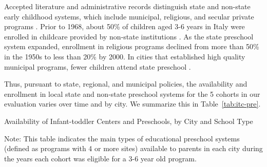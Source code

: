 Accepted literature and administrative records distinguish state and non-state early childhood systems, which include municipal, religious, and secular private programs \citep{Padova-Admin-Data_1964-2011,Reggio-Admin-data_1966-2006,Reggio-Annual-Journals_1994-2011,OECD_2001_Italy-Country-Note,Ribolzi_2013_Italy}. Prior to 1968, about 50\% of children aged 3-6 years in Italy were enrolled in childcare provided by non-state institutions \citep{Hohnerlein_2009_Paradox-Public-Preschools}. As the state preschool system expanded, enrollment in religious programs declined from more than 50\% in the 1950s to less than 20\% by 2000. In cities that established high quality municipal programs, fewer children attend state preschool \citep{OECD_2001_Italy-Country-Note}. 

Thus, pursuant to state, regional, and municipal policies, the availability and enrollment in local state and non-state preschool systems for the 5 cohorts in our evaluation varies over time and by city. We summarize this in Table~\ref{tab:itc-pre}. 

\begin{table}[H]
\centering
\caption{Availability of Infant-toddler Centers and Preschools, by City and School Type}\label{tab:itc-pre}
\begin{adjustbox}{width=\textwidth}
\begin{threeparttable}
	
\begin{tablenotes}
Note: This table indicates the main types of educational preschool systems (defined as programs with 4 or more sites) available to parents in each city during the years each cohort was eligible for a 3-6 year old program. 
\end{tablenotes}
\end{threeparttable}
\end{adjustbox}
\end{table}



